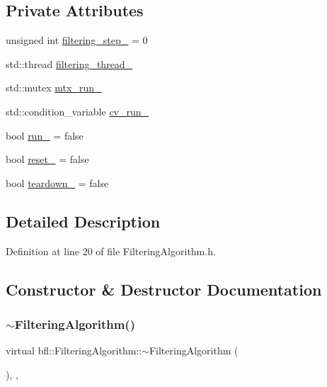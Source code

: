 \subsection*{Private Attributes}
\begin{DoxyCompactItemize}
\item 
unsigned int \mbox{\hyperlink{classbfl_1_1FilteringAlgorithm_a1d08a5db263e415138d88c9a01535767}{filtering\+\_\+step\+\_\+}} = 0
\item 
std\+::thread \mbox{\hyperlink{classbfl_1_1FilteringAlgorithm_a2fa16711fd751628977afbbf9f7e9d6d}{filtering\+\_\+thread\+\_\+}}
\item 
std\+::mutex \mbox{\hyperlink{classbfl_1_1FilteringAlgorithm_a8983a40e915d3dbbc306d8f281ac449b}{mtx\+\_\+run\+\_\+}}
\item 
std\+::condition\+\_\+variable \mbox{\hyperlink{classbfl_1_1FilteringAlgorithm_ae92a6d82ce18c35516f42a7109c931af}{cv\+\_\+run\+\_\+}}
\item 
bool \mbox{\hyperlink{classbfl_1_1FilteringAlgorithm_a826eea2b551a2c2beab38394ed4c57c9}{run\+\_\+}} = false
\item 
bool \mbox{\hyperlink{classbfl_1_1FilteringAlgorithm_a4edf8ab29c4a1f8148ea276561299acb}{reset\+\_\+}} = false
\item 
bool \mbox{\hyperlink{classbfl_1_1FilteringAlgorithm_a3bc20cde7fc24767328f8a1ebd3e8cc8}{teardown\+\_\+}} = false
\end{DoxyCompactItemize}


\subsection{Detailed Description}


Definition at line 20 of file Filtering\+Algorithm.\+h.



\subsection{Constructor \& Destructor Documentation}
\mbox{\label{classbfl_1_1FilteringAlgorithm_ab286cc00b054717679fb13a3b709b1c4}} 
\subsubsection{\texorpdfstring{$\sim$\+Filtering\+Algorithm()}{~FilteringAlgorithm()}}
{\footnotesize\ttfamily virtual bfl\+::\+Filtering\+Algorithm\+::$\sim$\+Filtering\+Algorithm (\begin{DoxyParamCaption}{ }\end{DoxyParamCaption})\hspace{0.3cm}{\ttfamily [inline]}, {\ttfamily [virtual]}, {\ttfamily [noexcept]}}



